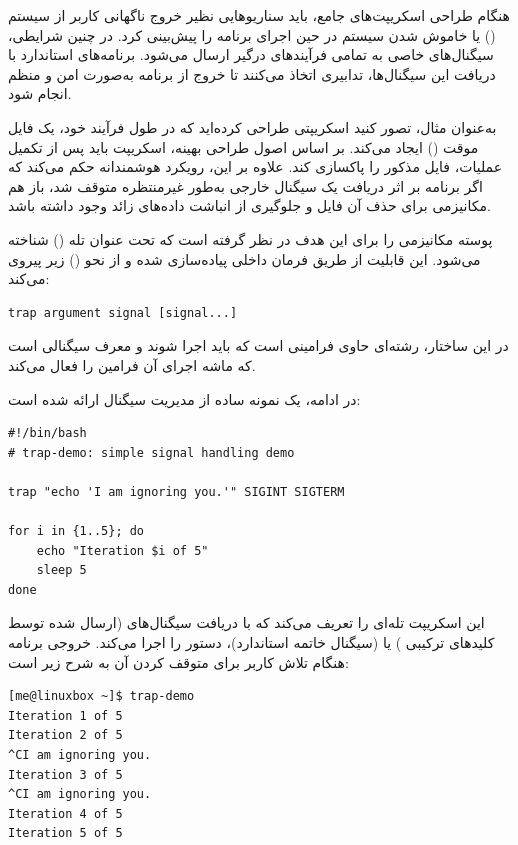 هنگام طراحی اسکریپت‌های جامع، باید سناریوهایی نظیر خروج ناگهانی کاربر از سیستم () یا خاموش شدن سیستم در حین اجرای برنامه را پیش‌بینی کرد. در چنین شرایطی، سیگنال‌های خاصی به تمامی فرآیندهای درگیر ارسال می‌شود. برنامه‌های استاندارد با دریافت این سیگنال‌ها، تدابیری اتخاذ می‌کنند تا خروج از برنامه به‌صورت امن و منظم انجام شود.

به‌عنوان مثال، تصور کنید اسکریپتی طراحی کرده‌اید که در طول فرآیند خود، یک فایل موقت () ایجاد می‌کند. بر اساس اصول طراحی بهینه، اسکریپت باید پس از تکمیل عملیات، فایل مذکور را پاکسازی کند. علاوه بر این، رویکرد هوشمندانه حکم می‌کند که اگر برنامه بر اثر دریافت یک سیگنال خارجی به‌طور غیرمنتظره متوقف شد، باز هم مکانیزمی برای حذف آن فایل و جلوگیری از انباشت داده‌های زائد وجود داشته باشد.

پوسته  مکانیزمی را برای این هدف در نظر گرفته است که تحت عنوان تله () شناخته می‌شود. این قابلیت از طریق فرمان داخلی  پیاده‌سازی شده و از نحو () زیر پیروی می‌کند:

\begin{latin}
\begin{lstlisting}
trap argument signal [signal...]
\end{lstlisting}
\end{latin}

در این ساختار،  رشته‌ای حاوی فرامینی است که باید اجرا شوند و  معرف سیگنالی است که ماشه اجرای آن فرامین را فعال می‌کند.

در ادامه، یک نمونه ساده از مدیریت سیگنال ارائه شده است:

\begin{latin}
\begin{lstlisting}
#!/bin/bash
# trap-demo: simple signal handling demo

trap "echo 'I am ignoring you.'" SIGINT SIGTERM

for i in {1..5}; do
    echo "Iteration $i of 5"
    sleep 5
done
\end{lstlisting}
\end{latin}

این اسکریپت تله‌ای را تعریف می‌کند که با دریافت سیگنال‌های  (ارسال شده توسط کلیدهای ترکیبی ) یا  (سیگنال خاتمه استاندارد)، دستور  را اجرا می‌کند. خروجی برنامه هنگام تلاش کاربر برای متوقف کردن آن به شرح زیر است:

\begin{latin}
\begin{lstlisting}
[me@linuxbox ~]$ trap-demo
Iteration 1 of 5
Iteration 2 of 5
^CI am ignoring you.
Iteration 3 of 5
^CI am ignoring you.
Iteration 4 of 5
Iteration 5 of 5
\end{lstlisting}
\end{latin}

